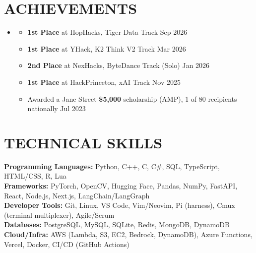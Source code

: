 \documentclass[letterpaper,11pt]{article}
\newcommand{\resumeItem}[1]{
  \item\small{
    {#1 \vspace{-4pt}}
  }
}
\newcommand{\resumeSubHeadingListStart}{\begin{itemize}[leftmargin=0.15in, label={}]}
\newcommand{\resumeSubHeadingListEnd}{\end{itemize}}
\newcommand{\resumeItemListStart}{\begin{itemize}}
\newcommand{\resumeItemListEnd}{\end{itemize}\vspace{-8pt}}
\begin{document}
\section{\textbf{ACHIEVEMENTS}}
  \resumeSubHeadingListStart
    \item
      \resumeItemListStart
        \resumeItem{\textbf{1st Place} at HopHacks, Tiger Data Track \hfill Sep 2026}
        \resumeItem{\textbf{1st Place} at YHack, K2 Think V2 Track \hfill Mar 2026}
        \resumeItem{\textbf{2nd Place} at NexHacks, ByteDance Track (Solo) \hfill Jan 2026}
        \resumeItem{\textbf{1st Place} at HackPrinceton, xAI Track \hfill Nov 2025}
        \resumeItem{Awarded a Jane Street \textbf{\$5,000} scholarship (AMP), 1 of 80 recipients nationally \hfill Jul 2023}
      \resumeItemListEnd
  \resumeSubHeadingListEnd

\section{\textbf{TECHNICAL SKILLS}}
 \begin{itemize}[leftmargin=0.15in, label={}, itemsep=-3pt, topsep=0pt]
    \small{\item{
     \textbf{Programming Languages:}{ Python, C++, C, C\#, SQL, TypeScript, HTML/CSS, R, Lua} \\
     \textbf{Frameworks:}{ PyTorch, OpenCV, Hugging Face, Pandas, NumPy, FastAPI, React, Node.js, Next.js, LangChain/LangGraph} \\
     \textbf{Developer Tools:}{ Git, Linux, VS Code, Vim/Neovim, Pi (harness), Cmux (terminal multiplexer), Agile/Scrum} \\
     \textbf{Databases:}{ PostgreSQL, MySQL, SQLite, Redis, MongoDB, DynamoDB} \\
     \textbf{Cloud/Infra:}{ AWS (Lambda, S3, EC2, Bedrock, DynamoDB), Azure Functions, Vercel, Docker, CI/CD (GitHub Actions)}
    }}
 \end{itemize}\vspace{-11pt}

\end{document}
